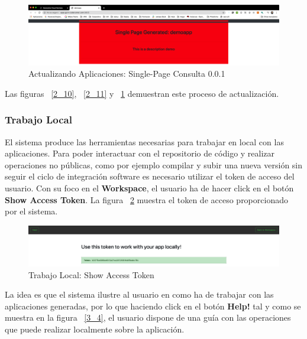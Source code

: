 \documentclass[a4paper,11pt]{book}
\begin{document}
 
   \begin{figure}[H]
\centering
\includegraphics[scale=0.23]{imagenes/casouso_a/2_12.png}
\caption{  Actualizando Aplicaciones: Single-Page Consulta 0.0.1 }
\label{2_12}
\end{figure}

Las figuras ~\ref{2_10},  ~\ref{2_11}  y  ~\ref{2_12} demuestran este proceso de actualización. 

\subsubsection{Trabajo Local}

El sistema produce las herramientas necesarias para trabajar en local con las aplicaciones. Para poder interactuar con el repositorio de código y realizar operaciones no públicas, como por ejemplo compilar y subir una nueva versión sin seguir el ciclo de integración software es necesario utilizar el token de acceso del usuario. Con su foco en el \textbf{Workspace}, el usuario ha de hacer click en el botón \textbf{Show Access Token}. La figura  ~\ref{3_1} muestra el token de acceso proporcionado por el sistema. 

   \begin{figure}[H]
\centering
\includegraphics[scale=0.22]{imagenes/casouso_a/3_1.png}
\caption{  Trabajo Local:  Show Access Token}
\label{3_1}
\end{figure}


La idea es que el sistema ilustre al usuario en como ha de trabajar con las aplicaciones generadas, por lo  que haciendo click en el botón \textbf{Help!}  tal y como se muestra en la figura ~\ref{3_4},   el usuario dispone de una guía con las operaciones que puede realizar localmente sobre la aplicación.
\end{document}
